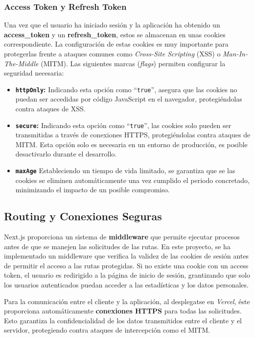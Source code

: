 \subsubsection*{Access Token y Refresh Token}

Una vez que el usuario ha iniciado sesión y la aplicación ha obtenido un \textbf{access\_token} y un \textbf{refresh\_token}, estos se almacenan en unas cookies correspondiente. La configuración de estas cookies es muy importante para protegerlas frente a ataques comunes como \textit{Cross-Site Scripting} (XSS) o \textit{Man-In-The-Middle} (MITM). Las siguientes marcas (\textit{flags}) permiten configurar la seguridad necesaria:

\begin{itemize}
    \item \textbf{\texttt{httpOnly}:} Indicando esta opción como ``\texttt{true}'', asegura que las cookies no puedan ser accedidas por código JavaScript en el navegador, protegiéndolas contra ataques de XSS.
    \item \textbf{\texttt{secure}:} Indicando esta opción como ``\texttt{true}'', las cookies solo pueden ser transmitidas a través de conexiones HTTPS, protegiéndolas contra ataques de MITM. Esta opción solo es necesaria en un entorno de producción, es posible desactivarlo durante el desarrollo.
    \item \textbf{\texttt{maxAge}} Estableciendo un tiempo de vida limitado, se garantiza que se las cookies se eliminen automáticamente una vez cumplido el periodo concretado, minimizando el impacto de un posible compromiso.
\end{itemize}

\subsection{Routing y Conexiones Seguras}

Next.js proporciona un sistema de \textbf{middleware} que permite ejecutar procesos antes de que se manejen las solicitudes de las rutas. En este proyecto, se ha implementado un middleware que verifica la validez de las cookies de sesión antes de permitir el acceso a las rutas protegidas. Si no existe una cookie con un access token, el usuario es redirigido a la página de inicio de sesión, grantizando que solo los usuarios autenticados puedan acceder a las estadísticas y los datos personales.

Para la comunicación entre el cliente y la aplicación, al desplegatse en \textit{Vercel}, éste proporciona automáticamente \textbf{conexiones HTTPS} para todas las solicitudes. Esto garantiza la confidencialidad de los datos transmitidos entre el cliente y el servidor, protegiendo contra ataques de intercepción como el MITM.

